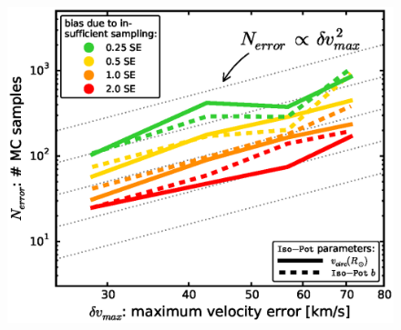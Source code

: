 

\begin{figure}[!htbp]
\centering
\includegraphics[width=\columnwidth]{figs/isoSphFlexErrConv_MC_vs_error_2.eps}

\end{figure}
